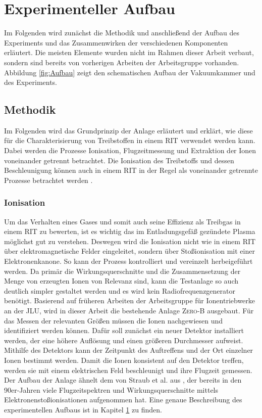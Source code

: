 \chapter{Experimenteller Aufbau}
\label{chap:Aufbau}
Im Folgenden wird zunächst die Methodik und anschließend der Aufbau des Experiments und das Zusammenwirken der verschiedenen Komponenten erläutert. Die meisten Elemente wurden nicht im Rahmen dieser Arbeit verbaut, sondern sind bereits von vorherigen Arbeiten der Arbeitsgruppe vorhanden. Abbildung \ref{fig:Aufbau} zeigt den schematischen Aufbau der Vakuumkammer und des Experiments.

\section{Methodik}
Im Folgenden wird das Grundprinzip der Anlage erläutert und erklärt, wie diese für die Charakterisierung von Treibstoffen in einem RIT verwendet werden kann. Dabei werden die Prozesse Ionisation, Flugzeitmessung und Extraktion der Ionen voneinander getrennt betrachtet. Die Ionisation des Treibstoffs und dessen Beschleunigung können auch in einem RIT in der Regel als voneinander getrennte Prozesse betrachtet werden \cite{ion}. 

\subsection{Ionisation} 
Um das Verhalten eines Gases und somit auch seine Effizienz als Treibgas in einem RIT zu bewerten, ist es wichtig das im Entladungsgefäß gezündete Plasma möglichst gut zu verstehen. Deswegen wird die Ionisation nicht wie in einem RIT über elektromagnetische Felder eingeleitet, sondern über Stoßionisation mit einer Elektronenkanone. So kann der Prozess kontrolliert und vereinzelt herbeigeführt werden. Da primär die Wirkungsquerschnitte und die Zusammensetzung der Menge von erzeugten Ionen von Relevanz sind, kann die Testanlage so auch deutlich simpler gestaltet werden und es wird kein Radiofrequenzgenerator benötigt. Basierend auf früheren Arbeiten der Arbeitsgruppe für Ionentriebwerke an der JLU, wird in dieser Arbeit die bestehende Anlage \textsc{Zero-B} ausgebaut. Für das Messen der relevanten Größen müssen die Ionen nachgewiesen und identifiziert werden können. Dafür soll zunächst ein neuer Detektor installiert werden, der eine höhere Auflösung und einen größeren Durchmesser aufweist. Mithilfe des Detektors kann der Zeitpunkt des Auftreffens und der Ort einzelner Ionen bestimmt werden. Damit die Ionen konsistent auf den Detektor treffen, werden sie mit einem elektrischen Feld beschleunigt und ihre Flugzeit gemessen. Der Aufbau der Anlage ähnelt dem von Straub et al. aus \cite{Straub}, der bereits in den 90er-Jahren viele Flugzeitspektren und Wirkungsquerschnitte mittels Elektronenstoßionisationen aufgenommen hat. Eine genaue Beschreibung des experimentellen Aufbaus ist in Kapitel \ref{chap:Aufbau} zu finden.

